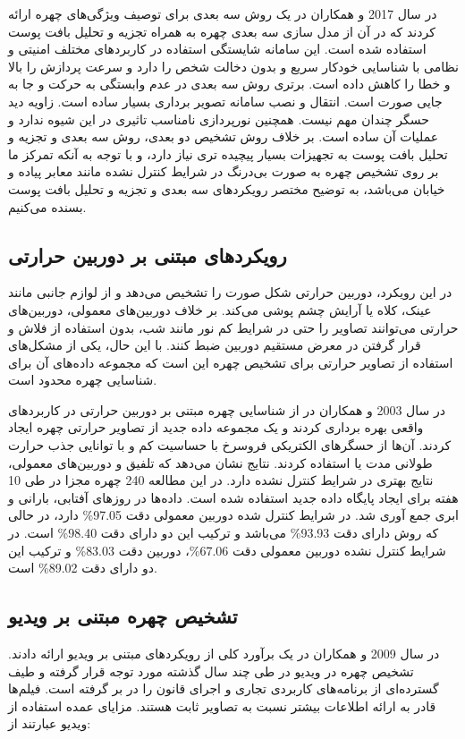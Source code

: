 \noindent
در سال 2017  و همکاران در \cite{HU2017366} یک روش سه بعدی برای توصیف ویژگی‌های چهره ارائه کردند که در آن از مدل سازی سه بعدی چهره به همراه تجزیه و تحلیل بافت پوست استفاده شده است. این سامانه شایستگی استفاده در کاربردهای مختلف امنیتی و نظامی با شناسایی خودکار سریع و بدون دخالت شخص را دارد و سرعت پردازش را بالا و خطا را کاهش داده است. برتری روش سه بعدی در عدم وابستگی به حرکت و جا به جایی صورت است. انتقال و نصب سامانه تصویر برداری بسیار ساده است. زاویه دید حسگر چندان مهم نیست. همچنین نورپردازی نامناسب تاثیری در این شیوه ندارد و عملیات آن ساده است.
بر خلاف روش تشخیص دو بعدی، روش سه بعدی و تجزیه و تحلیل بافت پوست به تجهیزات بسیار پیچیده تری نیاز دارد، و با توجه به آنکه تمرکز ما بر روی تشخیص چهره به صورت بی‌درنگ در شرایط کنترل نشده مانند معابر پیاده و خیابان می‌باشد، به توضیح مختصر رویکردهای سه بعدی و تجزیه و تحلیل بافت پوست بسنده می‌کنیم.

\subsection{رویکرد‌های مبتنی بر دوربین حرارتی}
در این رویکرد، دوربین حرارتی شکل صورت را تشخیص می‌دهد و از لوازم جانبی مانند عینک، کلاه یا آرایش چشم پوشی می‌کند. بر خلاف دوربین‌های معمولی، دوربین‌های حرارتی می‌توانند تصاویر را حتی در شرایط کم نور مانند شب، بدون استفاده از فلاش و قرار گرفتن در معرض مستقیم دوربین ضبط کنند. با این حال، یکی از مشکل‌های استفاده از تصاویر حرارتی برای تشخیص چهره این است که مجموعه داده‌های آن برای شناسایی چهره محدود است.

\noindent
در سال 2003  و همکاران در \cite{SOCOLINSKY200372} از شناسایی چهره مبتنی بر دوربین حرارتی در کاربردهای واقعی بهره برداری کردند و یک مجموعه داده جدید از تصاویر حرارتی چهره ایجاد کردند. آن‌ها از حسگرهای الکتریکی فروسرخ با حساسیت کم و با توانایی جذب حرارت طولانی مدت یا   استفاده کردند.
نتایج نشان می‌دهد که تلفیق  و دوربین‌های معمولی، نتایج بهتری در شرایط کنترل نشده دارد. در این مطالعه 240 چهره مجزا در طی 10 هفته برای ایجاد پایگاه داده جدید استفاده شده است. داده‌ها در روزهای آفتابی، بارانی و ابری جمع آوری شد. در شرایط کنترل شده دوربین معمولی دقت 97.05\% دارد، در حالی که روش  دارای دقت 93.93\% می‌باشد و ترکیب این دو دارای دقت 98.40\% است. در شرایط کنترل نشده دوربین معمولی دقت 67.06\%، دوربین  دقت 83.03\% و ترکیب این دو دارای دقت 89.02\% است.

\subsection{تشخیص چهره مبتنی بر ویدیو}
در سال 2009  و همکاران در \cite{wang2009video} یک برآورد کلی از رویکردهای مبتنی بر ویدیو ارائه دادند. تشخیص چهره در ویدیو در طی چند سال گذشته مورد توجه قرار گرفته و طیف گسترده‌ای از برنامه‌های کاربردی تجاری و اجرای قانون را در بر گرفته است. فیلم‌ها قادر به ارائه اطلاعات بیشتر نسبت به تصاویر ثابت هستند. مزایای عمده استفاده از ویدیو عبارتند از:

